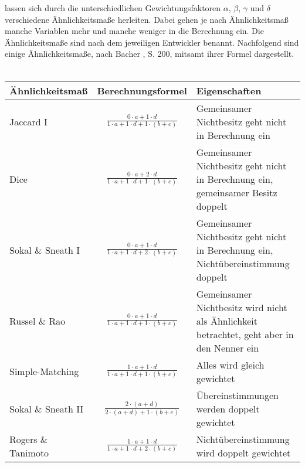 lassen sich durch die unterschiedlichen Gewichtungsfaktoren $\alpha$, $\beta$, $\gamma$ und $\delta$ verschiedene Ähnlichkeitsmaße herleiten. Dabei gehen je nach Ähnlichkeitsmaß manche Variablen mehr und manche weniger in die Berechnung ein. Die Ähnlichkeitsmaße sind nach dem jeweiligen Entwickler benannt.
Nachfolgend sind einige Ähnlichkeitsmaße, nach Bacher \cite{Bacher.2010}, S. 200, mitsamt ihrer Formel dargestellt. \\ 
\\
\begin{tabular}{|l|c|p{8cm}|}
	\hline
	\rowcolor{babyblueeyes}Ähnlichkeitsmaß & Berechnungsformel & Eigenschaften \\ \hline
	\rowcolor{beaublue}Jaccard I & $\frac{0 \cdot \textit{a} + 1 \cdot \textit{d}}{1 \cdot \textit{a} + 1 \cdot \textit{d} + 1 \cdot (\textit{b} + \textit{c})} $ & Gemeinsamer Nichtbesitz geht nicht in Berechnung ein \\ \hline
	\rowcolor{beaublue}Dice & $ \frac{0 \cdot \textit{a} + 2 \cdot \textit{d}}{1 \cdot \textit{a} + 1 \cdot \textit{d} + 1 \cdot (\textit{b} + \textit{c})} $ & Gemeinsamer Nichtbesitz geht nicht in Berechnung ein, gemeinsamer Besitz doppelt \\ \hline
	\rowcolor{beaublue}Sokal \& Sneath I & $ \frac{0 \cdot \textit{a} + 1 \cdot \textit{d}}{1 \cdot \textit{a} + 1 \cdot \textit{d} + 2 \cdot (\textit{b} + \textit{c})} $ & Gemeinsamer Nichtbesitz geht nicht in Berechnung ein, Nichtübereinstimmung doppelt \\ \hline
	\rowcolor{beaublue}Russel \& Rao & $ \frac{0 \cdot \textit{a} + 1 \cdot \textit{d}}{1 \cdot \textit{a} + 1 \cdot \textit{d} + 1 \cdot (\textit{b} + \textit{c})} $ & Gemeinsamer Nichtbesitz wird nicht als Ähnlichkeit betrachtet, geht aber in den Nenner ein \\ \hline
	\rowcolor{beaublue}Simple-Matching & $ \frac{1 \cdot \textit{a} + 1 \cdot \textit{d}}{1 \cdot \textit{a} + 1 \cdot \textit{d} + 1 \cdot (\textit{b} + \textit{c})} $ & Alles wird gleich gewichtet \\ \hline
	\rowcolor{beaublue}Sokal \& Sneath II & $ \frac{2 \cdot (\textit{a} + \textit{d})}{2 \cdot (\textit{a} + \textit{d}) + 1 \cdot (\textit{b} + \textit{c})} $ & Übereinstimmungen werden doppelt gewichtet \\ \hline
	\rowcolor{beaublue}Rogers \& Tanimoto & $ \frac{1 \cdot \textit{a} + 1 \cdot \textit{d}}{1 \cdot a + 1 \cdot \textit{d} + 2 \cdot (\textit{b} + \textit{c})} $ & Nichtübereinstimmung wird doppelt gewichtet \\ \hline
\end{tabular}
	

